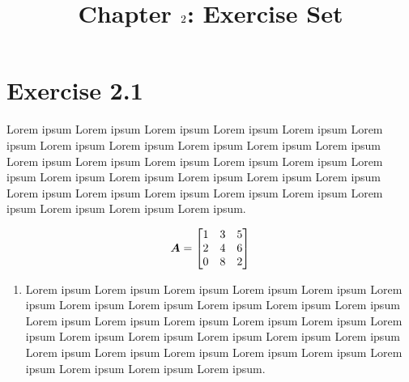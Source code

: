 \documentclass{article}
\author{}
\title{}
\date{\vspace{-5ex}}
\title{Chapter $\chapnumber$: Exercise Set}
\newcommand{\chapnumber}{2}
\begin{document}
\maketitle

\section*{Exercise \chapnumber.1}
Lorem ipsum Lorem ipsum Lorem ipsum Lorem ipsum Lorem ipsum Lorem ipsum Lorem ipsum Lorem ipsum Lorem ipsum Lorem ipsum Lorem ipsum Lorem ipsum
Lorem ipsum Lorem ipsum Lorem ipsum Lorem ipsum Lorem ipsum Lorem ipsum Lorem ipsum Lorem ipsum Lorem ipsum Lorem ipsum Lorem ipsum Lorem ipsum
Lorem ipsum Lorem ipsum Lorem ipsum Lorem ipsum Lorem ipsum Lorem ipsum Lorem ipsum.

\begin{equation}
{\bm{A}}
=
\begin{bmatrix}
    1 & 3 & 5 \\
    2 & 4 & 6 \\
    0 & 8 & 2 
\end{bmatrix}
\end{equation}

\begin{enumerate}[label=(\alph*)]
\item Lorem ipsum Lorem ipsum Lorem ipsum Lorem ipsum Lorem ipsum Lorem ipsum Lorem ipsum Lorem ipsum Lorem ipsum Lorem ipsum Lorem ipsum Lorem ipsum
Lorem ipsum Lorem ipsum Lorem ipsum Lorem ipsum Lorem ipsum Lorem ipsum Lorem ipsum Lorem ipsum Lorem ipsum Lorem ipsum Lorem ipsum Lorem ipsum
Lorem ipsum Lorem ipsum Lorem ipsum Lorem ipsum Lorem ipsum Lorem ipsum Lorem ipsum.
\end{enumerate} 
\end{document}
